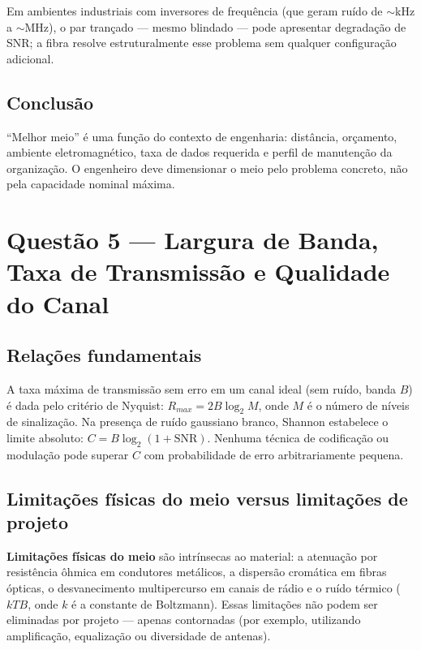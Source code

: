 \documentclass[conference]{IEEEtran}
\begin{document}
Em ambientes industriais com inversores de frequência (que geram ruído de $\sim$kHz a
$\sim$MHz), o par trançado --- mesmo blindado --- pode apresentar degradação de SNR; a fibra
resolve estruturalmente esse problema sem qualquer configuração adicional.

\subsection*{Conclusão}

``Melhor meio'' é uma função do contexto de engenharia: distância, orçamento, ambiente
eletromagnético, taxa de dados requerida e perfil de manutenção da organização. O engenheiro
deve dimensionar o meio pelo problema concreto, não pela capacidade nominal máxima.

\section*{Questão 5 — Largura de Banda, Taxa de Transmissão e Qualidade do Canal}

\subsection*{Relações fundamentais}

A taxa máxima de transmissão sem erro em um canal ideal (sem ruído, banda $B$) é dada pelo
critério de Nyquist: $R_{max} = 2B\log_2 M$, onde $M$ é o número de níveis de sinalização.
Na presença de ruído gaussiano branco, Shannon estabelece o limite absoluto:
$C = B\log_2(1 + \text{SNR})$. Nenhuma técnica de codificação ou modulação pode superar
$C$ com probabilidade de erro arbitrariamente pequena.

\subsection*{Limitações físicas do meio versus limitações de projeto}

\textbf{Limitações físicas do meio} são intrínsecas ao material: a atenuação por resistência
ôhmica em condutores metálicos, a dispersão cromática em fibras ópticas, o desvanecimento
multipercurso em canais de rádio e o ruído térmico ($kTB$, onde $k$ é a constante de
Boltzmann). Essas limitações não podem ser eliminadas por projeto --- apenas contornadas
(por exemplo, utilizando amplificação, equalização ou diversidade de antenas).
\end{document}
